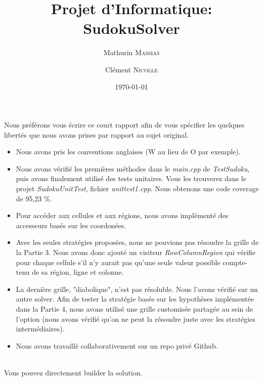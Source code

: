 \documentclass[11pt,a4paper]{article}
\title{Projet d'Informatique: SudokuSolver}
\author{Mathurin \textsc{Massias} \and Clément \textsc{Nicolle}}
\date{\today}
\begin{document}
	
\maketitle

Nous préférons vous écrire ce court rapport afin de vous spécifier les quelques libertés que nous avons prises par rapport au sujet original.
\\
\begin{itemize}
	\item Nous avons pris les conventions anglaises (W au lieu de O par exemple).
	\\
	\item Nous avons vérifié les premières méthodes dans le \textit{main.cpp} de \textit{TestSudoku}, puis avons finalement utilisé des tests unitaires. Vous les trouverez dans le projet \textit{SudokuUnitTest}, fichier \textit{unittest1.cpp}. Nous obtenons une code coverage de 95,23 \%.
	\\
	\item Pour accéder aux cellules et aux régions, nous avons implémenté des accesseurs basés sur les coordonées.
	\\
	\item Avec les seules stratégies proposées, nous ne pouvions pas résoudre la grille de la Partie 3. Nous avons donc ajouté un visiteur \textit{RowColumnRegion} qui vérifie pour chaque cellule s'il n'y aurait pas qu'une seule valeur possible compte-tenu de sa région, ligne et colonne.
	\\
	\item La dernière grille, "diabolique", n'est pas résoluble. Nous l'avons vérifié sur un autre solver. Afin de tester la stratégie basée sur les hypothèses implémentée dans la Partie 4, nous avons utilisé une grille customisée partagée au sein de l'option (nous avons vérifié qu'on ne peut la résoudre juste avec les stratégies intermédiaires).
	\\
	\item Nous avons travaillé collaborativement sur un repo privé Github.
\end{itemize}
%
\hspace{3mm}
\\
Vous pouvez directement builder la solution.
\end{document}
